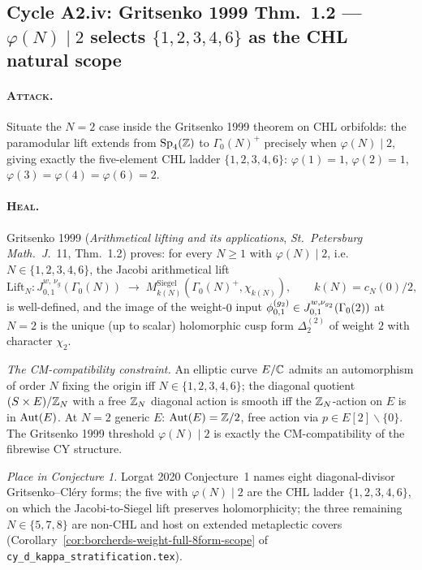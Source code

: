 \subsection{Cycle A2.iv: Gritsenko 1999 Thm.~1.2 --- $\varphi(N) \mid 2$
selects $\{1, 2, 3, 4, 6\}$ as the CHL natural scope}
\label{subsec:a2-cycle-iv}

\paragraph{\textsc{Attack}.}
Situate the $N = 2$ case inside the Gritsenko 1999 theorem on CHL
orbifolds: the paramodular lift extends from $\operatorname{Sp}_4(\mathbb{Z})$ to
$\Gamma_0(N)^+$ precisely when $\varphi(N) \mid 2$, giving exactly
the five-element CHL ladder $\{1, 2, 3, 4, 6\}$: $\varphi(1) = 1$,
$\varphi(2) = 1$, $\varphi(3) = \varphi(4) = \varphi(6) = 2$.

\paragraph{\textsc{Heal}. \ClaimStatusTheorem}
Gritsenko 1999 (\emph{Arithmetical lifting and its applications},
\emph{St.\ Petersburg Math.\ J.}~11, Thm.~1.2) proves: for every
$N \geq 1$ with $\varphi(N) \mid 2$, i.e.\ $N \in \{1, 2, 3, 4, 6\}$,
the Jacobi arithmetical lift
\[
  \mathrm{Lift}_N \colon J^{w,\,\nu_g}_{0,1}(\Gamma_0(N))
  \;\longrightarrow\; M_{k(N)}^{\mathrm{Siegel}}(\Gamma_0(N)^+, \chi_{k(N)}),
  \qquad k(N) = c_N(0)/2,
\]
is well-defined, and the image of the weight-$0$ input
$\phi^{(g_2)}_{0,1} \in J^{w, \nu_{g_2}}_{0,1}(\Gamma_0(2))$ at $N = 2$ is the
unique (up to scalar) holomorphic cusp form $\Delta_2^{(2)}$ of weight
$2$ with character $\chi_2$.

\emph{The CM-compatibility constraint.} An elliptic curve $E/\mathbb{C}$ admits
an automorphism of order $N$ fixing the origin iff $N \in \{1, 2, 3, 4, 6\}$;
the diagonal quotient $(S \times E)/\mathbb{Z}_N$ with a free $\mathbb{Z}_N$ diagonal action
is smooth iff the $\mathbb{Z}_N$-action on $E$ is in $\operatorname{Aut}(E)$. At $N = 2$ generic
$E$: $\operatorname{Aut}(E) = \mathbb{Z}/2$, free action via $p \in E[2] \smallsetminus\{0\}$.
The Gritsenko 1999 threshold $\varphi(N) \mid 2$ is exactly the
CM-compatibility of the fibrewise CY structure.

\emph{Place in Conjecture 1.} Lorgat 2020 Conjecture~1 names eight
diagonal-divisor Gritsenko--Cl\'ery forms; the five with
$\varphi(N) \mid 2$ are the CHL ladder $\{1,2,3,4,6\}$, on which the
Jacobi-to-Siegel lift preserves holomorphicity; the three remaining
$N \in \{5, 7, 8\}$ are non-CHL and host on extended metaplectic covers
(Corollary~\ref{cor:borcherds-weight-full-8form-scope} of
\texttt{cy\_d\_kappa\_stratification.tex}).

